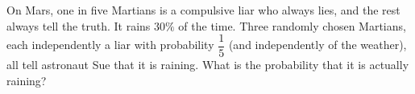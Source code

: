 On Mars, one in five Martians is a compulsive liar who always lies, and the rest always tell the truth. It rains $30\%$ of the time. Three randomly chosen Martians, each independently a liar with probability $\dfrac{1}{5}$ (and independently of the weather), all tell astronaut Sue that it is raining. What is the probability that it is actually raining?
